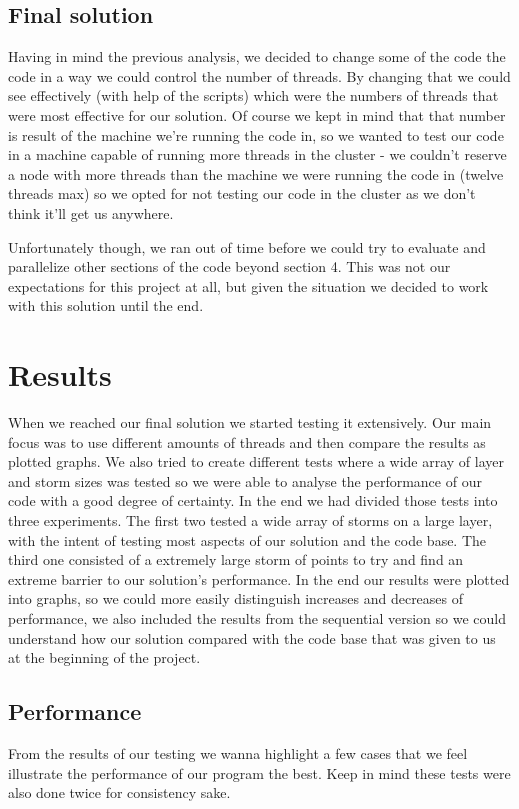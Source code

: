 \documentclass[10pt,journal,compsoc]{IEEEtran}
\begin{document}
\subsection{Final solution}
Having in mind the previous analysis, we decided to change some of the code the code in a way we could control the number of threads. By changing that we could see effectively (with help of the scripts) which were the numbers of threads that were most effective for our solution. Of course we kept in mind that that number is result of the machine we're running the code in, so we wanted to test our code in a machine capable of running more threads in the cluster - we couldn't reserve a node with more threads than the machine we were running the code in (twelve threads max) so we opted for not testing our code in the cluster as we don't think it'll get us anywhere.

Unfortunately though, we ran out of time before we could try to evaluate and parallelize other sections of the code beyond section 4. This was not our expectations for this project at all, but given the situation we decided to work with this solution until the end.

\section{Results}
When we reached our final solution we started testing it extensively. Our main focus was to use different amounts of threads and then compare the results as plotted graphs. We also tried to create different tests where a wide array of layer and storm sizes was tested so we were able to analyse the performance of our code with a good degree of certainty. In the end we had divided those tests into three experiments. The first two tested a wide array of storms on a large layer, with the intent of testing most aspects of our solution and the code base. The third one consisted of a extremely large storm of points to try and find an extreme barrier to our solution's performance. In the end our results were plotted into graphs, so we could more easily distinguish increases and decreases of performance, we also included the results from the sequential version so we could understand how our solution compared with the code base that was given to us at the beginning of the project. 

\subsection{Performance}
From the results of our testing we wanna highlight a few cases that we feel illustrate the performance of our program the best. Keep in mind these tests were also done twice for consistency sake.
\end{document}
